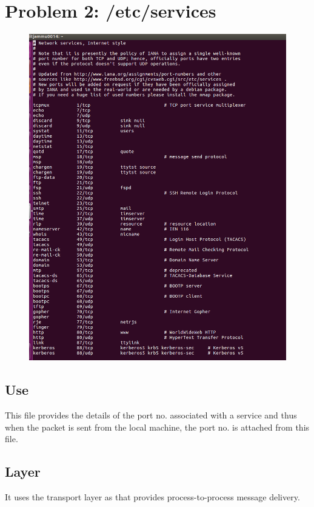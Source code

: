 \documentclass[]{report}
\begin{document}
\section{Problem 2: /etc/services}
\begin{figure}[H]
	\vspace{0pt}
	\includegraphics[width=\linewidth, keepaspectratio]{Snapshots/exe2/services.png}
\end{figure}

\subsection{Use}
This file provides the details of the port no. associated with a service and thus when the packet is sent from the local machine, the port no. is attached from this file. 

\subsection{Layer}
It uses the transport layer as that provides process-to-process message delivery.
\end{document}
